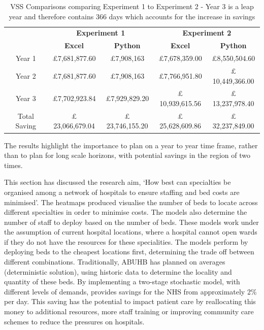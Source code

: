 \documentclass[../thesis.tex]{subfiles}
\begin{document}
\begin{table}[h!]
    \centering
    \begin{tabular}{ccccc}\toprule
    & \multicolumn{2}{c}{\textbf{Experiment 1}}& \multicolumn{2}{c}{\textbf{Experiment 2}} \\
         & \textbf{Excel} & \textbf{Python}  & \textbf{Excel} & \textbf{Python} \\\midrule
         Year 1& $\pounds$7,681,877.60 & $\pounds$7,908,163 & $\pounds$7,678,359.00&$\pounds$8,550,504.60 \\
         Year 2& $\pounds$7,681,877.60  & $\pounds$7,908,163&$\pounds$7,766,951.80 &$\pounds$10,449,366.00\\
         Year 3& $\pounds$7,702,923.84  &$\pounds$7,929,829.20 &  $\pounds$10,939,615.56 &$\pounds$13,237,978.40\\\midrule
        Total Saving & $\pounds$23,066,679.04 & $\pounds$23,746,155.20&$\pounds$25,628,609.86&   $\pounds$32,237,849.00\\\bottomrule
    \end{tabular}
    \caption{VSS Comparisons comparing Experiment 1 to Experiment 2 - Year 3 is a leap year and therefore contains 366 days which accounts for the increase in savings}
    \label{tab:vsscomparisons}
\end{table}

The results highlight the importance to plan on a year to year time frame, rather than to plan for long scale horizons, with potential savings in the region of two times.

This section has discussed the research aim, `How best can specialties be organised among a network of hospitals to ensure staffing and bed costs are minimised'. The heatmaps produced visualise the number of beds to locate across different specialties in order to minimise costs. The models also determine the number of staff to deploy based on the number of beds. These models work under the assumption of current hospital locations, where a hospital cannot open wards if they do not have the resources for these specialities. The models perform by deploying beds to the cheapest locations first, determining the trade off between different combinations. Traditionally, ABUHB has planned on averages (deterministic solution), using historic data to determine the locality and quantity of these beds. By implementing a two-stage stochastic model, with different levels of demands, provides savings for the NHS from approximately 2\% per day. This saving has the potential to impact patient care by reallocating this money to additional resources, more staff training or improving community care schemes to reduce the pressures on hospitals.
\end{document}
